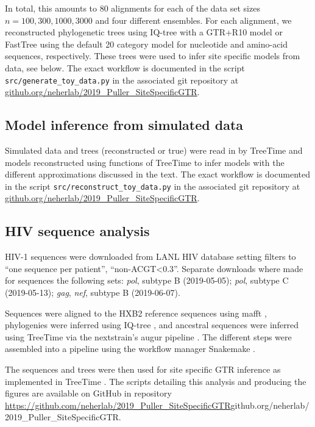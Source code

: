 \documentclass[aps,rmp,twocolumn]{revtex4}
\newcommand{\gene}[1]{{\it #1}}
\begin{document}
In total, this amounts to 80 alignments for each of the data set sizes $n=100,300,1000,3000$ and four different ensembles.
For each alignment, we reconstructed phylogenetic trees using IQ-tree \citep{nguyen_iq-tree:_2015} with a GTR+R10 model or FastTree \citep{FastTree} using the default 20 category model for nucleotide and amino-acid sequences, respectively.
These trees were used to infer site specific models from data, see below.
The exact workflow is documented in the script \texttt{src/generate\_toy\_data.py} in the associated git repository at \href{https://github.com/neherlab/2019_Puller_SiteSpecificGTR}{github.org/neherlab/2019\_Puller\_SiteSpecificGTR}.

\subsection*{Model inference from simulated data}
Simulated data and trees (reconstructed or true) were read in by TreeTime and models reconstructed using functions of TreeTime to infer models with the different approximations discussed in the text.
The exact workflow is documented in the script \texttt{src/reconstruct\_toy\_data.py} in the associated git repository at \href{https://github.com/neherlab/2019_Puller_SiteSpecificGTR}{github.org/neherlab/2019\_Puller\_SiteSpecificGTR}.

\subsection*{HIV sequence analysis}
HIV-1 sequences were downloaded from LANL HIV database \citep{LANL} setting filters to ``one sequence per patient'', ``non-ACGT\textless 0.3''.
Separate downloads where made for sequences the following sets: \gene{pol}, subtype B (2019-05-05); \gene{pol}, subtype C (2019-05-13); \gene{gag}, \gene{nef}, subtype B (2019-06-07).

Sequences were aligned to the HXB2 reference sequences using mafft \citep{katoh2013mafft}, phylogenies were inferred using IQ-tree \citep{nguyen_iq-tree:_2015}, and ancestral sequences were inferred using TreeTime \citep{sagulenko2017treetime} via the nextstrain's augur pipeline \citep{hadfield_nextstrain:_2018}.
The different steps were assembled into a pipeline using the workflow manager Snakemake \citep{koster_snakemakescalable_2012}.

The sequences and trees were then used for site specific GTR inference as implemented in TreeTime \citep{sagulenko2017treetime}.
The scripts detailing this analysis and producing the figures are available on GitHub in repository \url{https://github.com/neherlab/2019_Puller_SiteSpecificGTR}{github.org/neherlab/2019\_Puller\_SiteSpecificGTR}.
\end{document}
